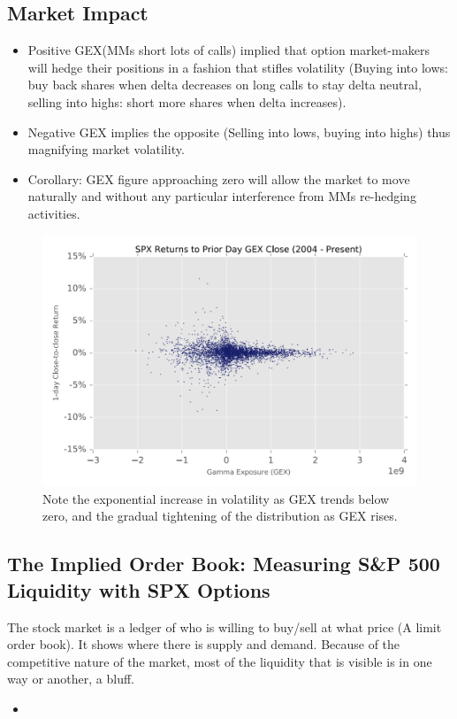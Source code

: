 \documentclass[12pt, oneside]{article}
\begin{document}
\subsection{Market Impact}
\begin{itemize}
    \item Positive GEX(MMs short lots of calls) implied that option market-makers will hedge their positions in a fashion that stifles volatility (Buying into lows: buy back shares when delta decreases on long calls to stay delta neutral, selling into highs: short more shares when delta increases).
    \item Negative GEX implies the opposite (Selling into lows, buying into highs) thus magnifying market volatility.
    \item Corollary: GEX figure approaching zero will allow the market to move naturally and without any particular interference from MMs re-hedging activities. 
\end{itemize}

\begin{figure}[!ht]
    \centering
    \includegraphics[width=\textwidth]{SPX Returns to Prior Day GEX Close.png}        
    \caption{Note the exponential increase in volatility as GEX trends below zero, and the gradual tightening of the distribution as GEX rises.}
\end{figure}

\newpage
\subsection{The Implied Order Book: Measuring S\&P 500 Liquidity with SPX Options}
The stock market is a ledger of who is willing to buy/sell at what price (A limit order book). It shows where there is supply and demand. Because of the competitive nature of the market, most of the liquidity that is visible is in one way or another, a bluff. 
\begin{itemize}
    \item 
\end{itemize}
\end{document}
